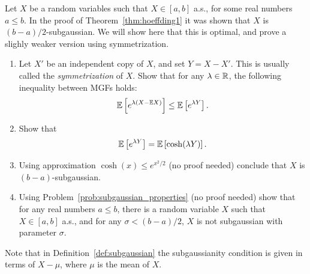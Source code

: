 \begin{myexercise}
    \label{prob:hoeffding_lemma}
    Let $X$ be a random variables such that $X \in [a, b]$ a.s., for some real numbers $a \leq b$. In the proof of Theorem~\ref{thm:hoeffding1} it was shown that $X$ is $(b-a)/2$-subgaussian. We will show here that this is optimal, and prove a slighly weaker version using symmetrization.
    \begin{enumerate}
        \item Let $X'$ be an independent copy of $X$, and set $Y = X - X'$. This is usually called the \textit{symmetrization} of $X$. Show that for any $\lambda \in \mathbb{R}$, the following inequality between MGFs holds:
        \begin{equation*}
            \mathbb{E}\left[ e^{\lambda (X - \mathbb{E} X)} \right] \leq \mathbb{E}\left[ e^{\lambda Y} \right].
        \end{equation*}
        
        \item Show that
        \begin{equation*}
            \mathbb{E}\left[ e^{\lambda Y} \right] = \mathbb{E}\left[ \cosh(\lambda Y) \right].
        \end{equation*}

        \item Using approximation $\cosh(x) \leq e^{x^2/2}$ (no proof needed) conclude that $X$ is $(b-a)$-subgaussian.

        \item Using Problem~\ref{prob:subgaussian_properties} (no proof needed) show that for any real numbers $a \leq b$, there is a random variable $X$ such that $X \in [a, b]$ a.s., and for any $\sigma < (b-a)/2$, $X$ is not subgaussian with parameter $\sigma$.
    \end{enumerate}
\end{myexercise}
\begin{remark}
    Note that in Definition~\ref{def:subgaussian} the subgaussianity condition is given in terms of $X-\mu$, where $\mu$ is the mean of $X$.
\end{remark}

